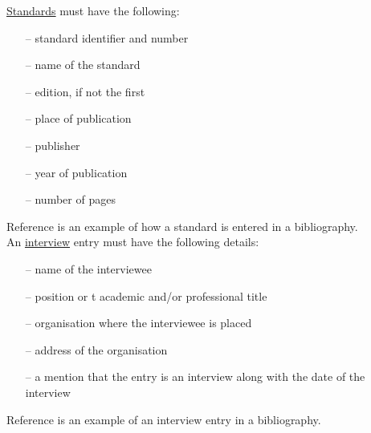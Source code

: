 \documentclass[english, 12pt, a4paper, biz, utf8, a-2b, online]{aaltothesis}
\begin{document}
\noindent
\underline{Standards} must have the following:
\begin{itemize}
\setlength{\itemsep}{-3pt}
\item[--]standard identifier and number
\item[--]name of the standard
\item[--]edition, if not the first
\item[--]place of publication
\item[--]publisher
\item[--]year of publication
\item[--]number of pages
\end{itemize}
Reference \cite{sfs} is an example of how a standard is entered in a 
bibliography.\\

\noindent
An \underline{interview} entry must have the following details:
\begin{itemize}
\setlength{\itemsep}{-3pt}
\item[--]name of the interviewee
\item[--]position or t academic and/or professional title
\item[--]organisation where the interviewee is placed
\item[--]address of the organisation
\item[--]a mention that the entry is an interview along with the date of the 
interview
\end{itemize}
Reference \cite{interview} is an example of an interview entry in a 
bibliography.
\end{document}
